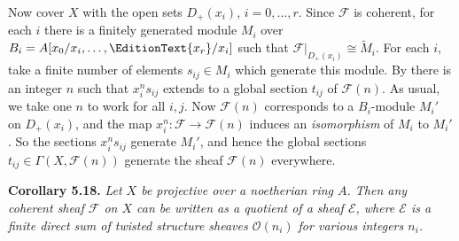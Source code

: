{Now cover $X$ with the open sets $D_+(x_i)$, $i=0,\ldots,r$. Since $\mathcal F$ is coherent, for each $i$ there is a finitely generated module $M_i$ over $B_i=A[x_0/x_i,\ldots,\EditionText{x_r}/x_i]$ such that $\mathcal F|_{D_+(x_i)}\cong\widetilde M_i$. For each $i$, take a finite number of elements $s_{ij}\in M_i$ which generate this module. By  there is an integer $n$ such that $x_i^ns_{ij}$ extends to a global section $t_{ij}$ of $\mathcal F(n)$. As usual, we take one $n$ to work for all $i,j$. Now $\mathcal F(n)$ corresponds to a $B_i$-module $M_i'$ on $D_+(x_i)$, and the map $x_i^n\colon\mathcal F\to\mathcal F(n)$ induces an \emph{isomorphism} of $M_i$ to $M_i'$. So the sections $x_i^ns_{ij}$ generate $M_i'$, and hence the global sections $t_{ij}\in\Gamma(X,\mathcal F(n))$ generate the sheaf $\mathcal F(n)$ everywhere.

\medskip
\noindent\hypertarget{result-II-5.18}{}\textbf{Corollary 5.18.} \emph{Let $X$ be projective over a noetherian ring $A$. Then any coherent sheaf $\mathcal F$ on $X$ can be written as a quotient of a sheaf $\mathcal E$, where $\mathcal E$ is a finite direct sum of twisted structure sheaves $\mathcal O(n_i)$ for various integers $n_i$.}
}
